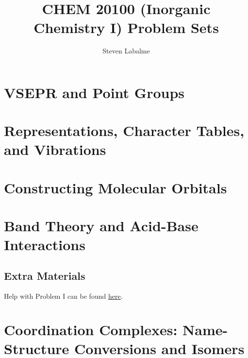 \documentclass[titlepage]{article}
\title{CHEM 20100 (Inorganic Chemistry I) Problem Sets}
\author{Steven Labalme}
\numberwithin{figure}{section}
\numberwithin{table}{section}
\begin{document}
\maketitle



\tableofcontents
\newpage



\pagestyle{main}
\renewcommand{\leftmark}{Problem Set \thesection}
% 



\section{VSEPR and Point Groups}

\newpage



\section{Representations, Character Tables, and Vibrations}

\newpage



\section{Constructing Molecular Orbitals}

\newpage



\section{Band Theory and Acid-Base Interactions}



\subsection{Extra Materials}
Help with Problem I can be found \href{https://courses.cit.cornell.edu/ece407/Lectures/handout3.pdf?fbclid=IwAR3KV4T7d_OBTlnd5kNTxmYTSlkJJSWLNfx8YGSNt-mtykwIfxkG4nWkGoQ}{\underline{here}}.
\newpage



\section{Coordination Complexes: Name-Structure Conversions and Isomers}

\newpage
\end{document}
